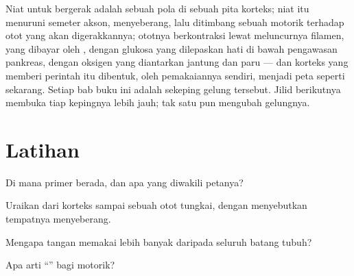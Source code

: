 \begin{remark}\label{rem:g12:brain-and-movement:loop}
Niat untuk bergerak adalah sebuah pola  di sebuah pita
korteks; niat itu menuruni semeter akson, menyeberang, lalu ditimbang
sebuah  motorik terhadap  otot yang akan digerakkannya;
ototnya berkontraksi lewat meluncurnya filamen, yang dibayar oleh 
, dengan glukosa yang dilepaskan hati di bawah pengawasan
pankreas, dengan oksigen yang diantarkan jantung dan paru --- dan
korteks yang memberi perintah itu dibentuk, oleh pemakaiannya sendiri,
menjadi peta seperti sekarang. Setiap bab buku ini adalah sekeping
gelung tersebut. Jilid berikutnya membuka tiap kepingnya lebih jauh;
tak satu pun mengubah gelungnya.
\end{remark}

\section{Latihan}

\begin{exercise}[$\star$]\label{exo:g12:brain-and-movement:1}
Di mana  primer berada, dan apa yang diwakili petanya?
\end{exercise}

\begin{exercise}[$\star$]\label{exo:g12:brain-and-movement:2}
Uraikan  dari korteks sampai sebuah otot tungkai,
dengan menyebutkan tempatnya menyeberang.
\end{exercise}

\begin{exercise}[$\star$]\label{exo:g12:brain-and-movement:3}
Mengapa tangan memakai lebih banyak  daripada seluruh
batang tubuh?
\end{exercise}

\begin{exercise}[$\star$]\label{exo:g12:brain-and-movement:4}
Apa arti ``'' bagi  motorik?
\end{exercise}

